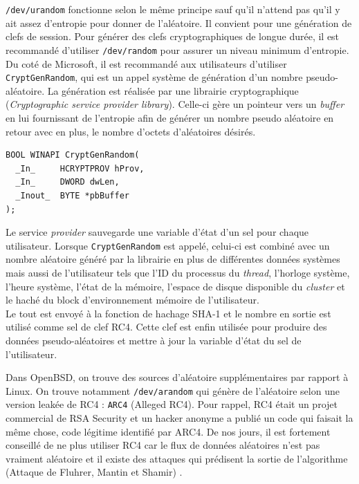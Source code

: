 \texttt{/dev/urandom} fonctionne selon le même principe sauf qu'il n'attend pas qu'il y ait assez d'entropie pour donner de l'aléatoire. Il convient pour une génération de clefs de session. Pour générer des clefs cryptographiques de longue durée, il est recommandé d'utiliser \texttt{/dev/random} pour assurer un niveau minimum d'entropie.\\

Du coté de Microsoft, il est recommandé aux utilisateurs d'utiliser \texttt{CryptGenRandom}, qui est un appel système de génération d'un nombre pseudo-aléatoire. La génération est réalisée par une librairie cryptographique (\textit{Cryptographic service provider library}). Celle-ci gère un pointeur vers un \textit{buffer} en lui fournissant de l'entropie afin de générer un nombre pseudo aléatoire en retour avec en plus, le nombre d'octets d'aléatoires désirés.

\begin{verbatim}
BOOL WINAPI CryptGenRandom(
  _In_     HCRYPTPROV hProv,
  _In_     DWORD dwLen,
  _Inout_  BYTE *pbBuffer
);
\end{verbatim}


Le service \textit{provider} sauvegarde une variable d'état d'un sel pour chaque utilisateur. Lorsque \texttt{CryptGenRandom} est appelé, celui-ci est combiné avec un nombre aléatoire généré par la librairie en plus de différentes données systèmes mais aussi de l'utilisateur tels que l'ID du processus  du \textit{thread}, l'horloge système, l'heure système, l'état de la mémoire, l'espace de disque disponible du \textit{cluster} et le haché du block d'environnement mémoire de l'utilisateur. \\

Le tout est envoyé à la fonction de hachage SHA-1 et le nombre en sortie est utilisé comme sel de clef RC4.  Cette clef est enfin utilisée pour produire des données pseudo-aléatoires et mettre à jour la variable d'état du sel de l'utilisateur. 

Dans OpenBSD, on trouve des sources d'aléatoire supplémentaires par rapport à Linux. On trouve notamment \texttt{/dev/arandom} qui génère de l'aléatoire selon une version leakée de RC4 : \texttt{ARC4} (Alleged RC4). Pour rappel, RC4 était un projet commercial de RSA Security et un hacker anonyme a publié un code qui faisait la même chose, code légitime identifié par ARC4. De nos jours, il est fortement conseillé de ne plus utiliser RC4 car le flux de données aléatoires n'est pas vraiment aléatoire et il existe des attaques qui prédisent la sortie de l'algorithme (Attaque de Fluhrer, Mantin et Shamir) \nocite{Fluhrer01weaknessesin}.



